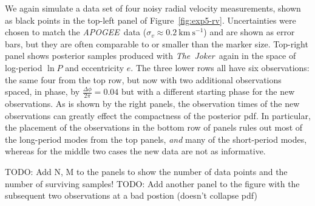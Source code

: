 \documentclass[manuscript, letterpaper]{aastex6}
\newcommand{\project}[1]{\textsl{#1}}
\newcommand{\acronym}[1]{{\small{#1}}}
\newcommand{\apogee}{\project{\acronym{APOGEE}}}
\newcommand{\samplername}{\project{The~Joker}}
\newcommand{\figname}{Figure}
\newcommand{\kms}{\mathrm{km}~\mathrm{s}^{-1}}
\newcommand{\todo}[1]{{\color{red}TODO: #1}}
\begin{document}
We again simulate a data set of four noisy radial velocity measurements, shown
as black points in the top-left panel of \figname~\ref{fig:exp5-rv}.
Uncertainties were chosen to match the \apogee\ data ($\sigma_v \approx
0.2~\kms$) and are shown as error bars, but they are often comparable to or
smaller than the marker size.
Top-right panel shows posterior samples produced with \samplername\ again in the
space of log-period $\ln P$ and eccentricity $e$.
The three lower rows all have six observations: the same four from the top row,
but now with two additional observations spaced, in phase, by $\frac{\Delta
\phi}{2 \pi} = 0.04$ but with a different starting phase for the new
observations.
As is shown by the right panels, the observation times of the new observations
can greatly effect the compactness of the posterior pdf.
In particular, the placement of the observations in the bottom row of panels
rules out most of the long-period modes from the top panels, \emph{and} many of
the short-period modes, whereas for the middle two cases the new data are not as
informative.

\todo{Add N, M to the panels to show the number of data points and the number of
surviving samples!}
\todo{Add another panel to the figure with the subsequent two observations at a
bad postion (doesn't collapse pdf)}
\end{document}
